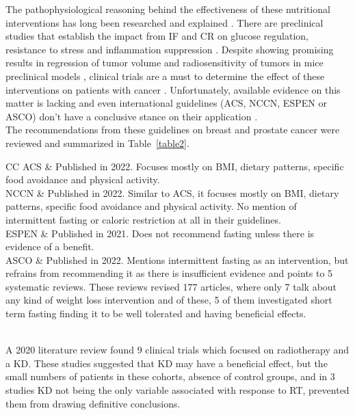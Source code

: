 \documentclass[journal,article,submit,pdftex,moreauthors]{Definitions/mdpi}
\begin{document}
The pathophysiological reasoning behind the effectiveness of these nutritional interventions has long been researched and explained \cite{madeo2019caloric, alidadi2021effect, klement2014calories}. There are preclinical studies that establish the impact from IF and CR on glucose regulation, resistance to stress and inflammation suppression \cite{trepanowski2018effects}. Despite showing promising results in regression of tumor volume and radiosensitivity of tumors in mice preclinical models \cite{kharazi1994combined, safdie2012fasting, saleh2013caloric, simone2016caloric}, clinical trials are a must to determine  the effect of these interventions on patients with cancer \cite{mercier2022dietary}. Unfortunately, available evidence on this matter is lacking and even international guidelines (ACS, NCCN, ESPEN or ASCO) don’t have a conclusive stance on their application \cite{rock2022american,sanft2022survivorship,muscaritoli2021espen,ligibel2022exercise}.\\

The recommendations from these guidelines on breast and prostate cancer were reviewed and summarized in Table~\ref{table2}.\\

\begin{table}[H] 
\caption{\textbf{Summary of recommendations from international guidelines}. ACS (American Cancer Society). NCCN (National Comprehensive Cancer Network). ESPEN (The European Society for Clinical Nutrition and Metabolism). ASCO (American Society of Clinical Oncology)..\label{table2}}
\begin{tabularx}{\textwidth}{CC}
\toprule
ACS	& Published in 2022. Focuses mostly on BMI, dietary patterns, specific food avoidance and physical activity.			\\
\midrule
NCCN		& Published in 2022. Similar to ACS, it focuses mostly on BMI, dietary patterns, specific food avoidance and physical activity. No mention of intermittent fasting or caloric restriction at all in their guidelines.			\\
\midrule
ESPEN		& Published in 2021. Does not recommend fasting unless there is evidence of a benefit.			\\
\midrule
ASCO		& Published in 2022. Mentions intermittent fasting as an intervention, but refrains from recommending it as there is insufficient evidence and points to 5 systematic reviews. These reviews revised 177 articles, where only 7 talk about any kind of weight loss intervention and of these, 5 of them investigated short term fasting finding it to be well tolerated and having beneficial effects.			\\
\bottomrule
\end{tabularx}
\end{table}
\\
A 2020 literature review \cite{icard2020perspective} found 9 clinical trials which focused on radiotherapy and a KD. These studies suggested that KD may have a beneficial effect, but the small numbers of patients in these cohorts, absence of control groups, and in 3 studies KD not being the only variable associated with response to RT, prevented them from drawing definitive conclusions.\\
\end{document}
